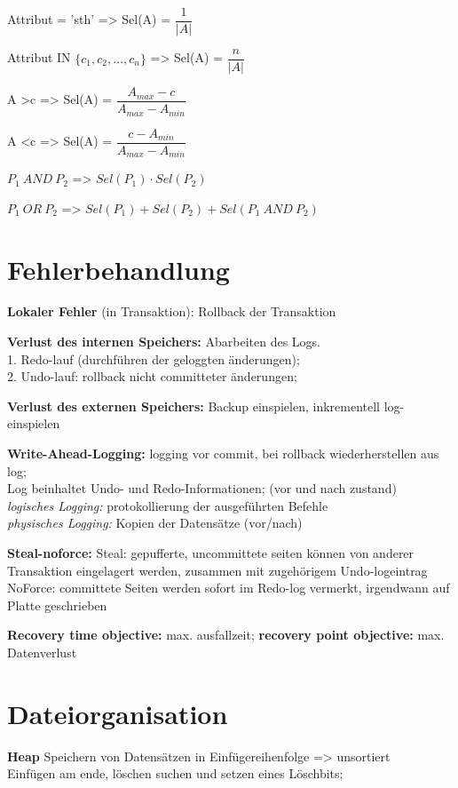 Attribut = 'sth' => Sel(A) = $\dfrac{1}{|A|}$

Attribut IN $\{c_1,c_2, \dots , c_n\}$ => Sel(A) = $\dfrac{n} { |A|}$

A >c => Sel(A) = $\dfrac{A_{max} -c }{A_{max} - A_{min}}$

A <c => Sel(A) = $\dfrac{c- A_{min} }{A_{max} - A_{min}}$

$P_1~AND~P_2$ => $Sel(P_1) \cdot Sel(P_2)$

$P_1~OR~P_2$ => $Sel(P_1) + Sel(P_2) + Sel(P_1~AND~P_2)$



\section{Fehlerbehandlung}
\textbf{Lokaler Fehler} (in Transaktion): Rollback der Transaktion

\textbf{Verlust des internen Speichers:} Abarbeiten des Logs.\\
1. Redo-lauf (durchführen der geloggten änderungen); \\
2. Undo-lauf: rollback nicht committeter änderungen;

\textbf{Verlust des externen Speichers:} Backup einspielen, inkrementell log-einspielen


\textbf{Write-Ahead-Logging:} logging vor commit, bei rollback wiederherstellen aus log;\\
Log beinhaltet Undo- und Redo-Informationen; (vor und nach zustand)\\
\textit{logisches Logging:} protokollierung der ausgeführten Befehle\\
\textit{physisches Logging:} Kopien der Datensätze (vor/nach)

\textbf{Steal-noforce:}
Steal: gepufferte, uncommittete seiten können von anderer Transaktion eingelagert werden, zusammen mit zugehörigem Undo-logeintrag\\
NoForce: committete Seiten werden sofort im Redo-log vermerkt, irgendwann auf Platte geschrieben



\textbf{Recovery time objective:} max. ausfallzeit; \textbf{recovery point objective:} max. Datenverlust

\section{Dateiorganisation}
\textbf{Heap} Speichern von Datensätzen in Einfügereihenfolge => unsortiert\\
Einfügen am ende, löschen suchen und setzen eines Löschbits;

